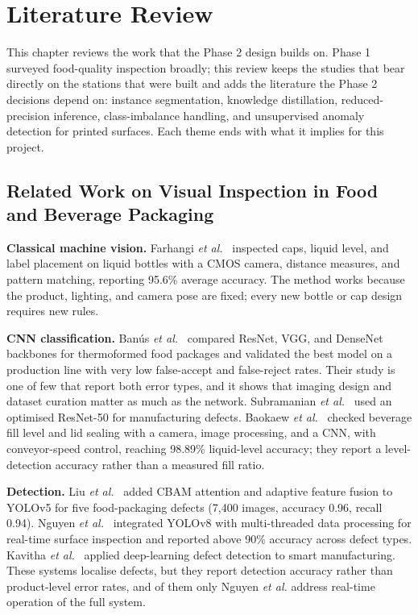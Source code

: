 \chapter{Literature Review}
\label{ch:lit}

This chapter reviews the work that the Phase 2 design builds on. Phase 1 surveyed food-quality inspection broadly; this review keeps the studies that bear directly on the stations that were built and adds the literature the Phase 2 decisions depend on: instance segmentation, knowledge distillation, reduced-precision inference, class-imbalance handling, and unsupervised anomaly detection for printed surfaces. Each theme ends with what it implies for this project.

\section{Related Work on Visual Inspection in Food and Beverage Packaging}
\label{sec:lit-food}

\noindent\textbf{Classical machine vision.} Farhangi \textit{et al.}~\cite{farhangi2024} inspected caps, liquid level, and label placement on liquid bottles with a CMOS camera, distance measures, and pattern matching, reporting 95.6\% average accuracy. The method works because the product, lighting, and camera pose are fixed; every new bottle or cap design requires new rules.

\noindent\textbf{CNN classification.} Ban\'us \textit{et al.}~\cite{banus2021} compared ResNet, VGG, and DenseNet backbones for thermoformed food packages and validated the best model on a production line with very low false-accept and false-reject rates. Their study is one of few that report both error types, and it shows that imaging design and dataset curation matter as much as the network. Subramanian \textit{et al.}~\cite{subramanian2025} used an optimised ResNet-50 for manufacturing defects. Baokaew \textit{et al.}~\cite{chatchapol2024} checked beverage fill level and lid sealing with a camera, image processing, and a CNN, with conveyor-speed control, reaching 98.89\% liquid-level accuracy; they report a level-detection accuracy rather than a measured fill ratio.

\noindent\textbf{Detection.} Liu \textit{et al.}~\cite{liu2025} added CBAM attention and adaptive feature fusion to YOLOv5 for five food-packaging defects (7,400 images, accuracy 0.96, recall 0.94). Nguyen \textit{et al.}~\cite{nguyen2025} integrated YOLOv8 with multi-threaded data processing for real-time surface inspection and reported above 90\% accuracy across defect types. Kavitha \textit{et al.}~\cite{kavitha2024} applied deep-learning defect detection to smart manufacturing. These systems localise defects, but they report detection accuracy rather than product-level error rates, and of them only Nguyen \textit{et al.} address real-time operation of the full system.

